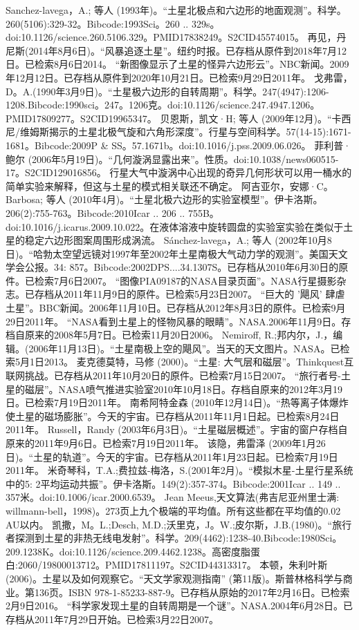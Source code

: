\begin{enumerate}
 Sanchez-lavega，A.; 等人 (1993年)。“土星北极点和六边形的地面观测”。科学。260(5106):329-32。Bibcode:1993Sci。260 .. 329s。doi:10.1126/science.260.5106.329。PMID17838249。S2CID45574015。  
 再见，丹尼斯(2014年8月6日)。“风暴追逐土星”。纽约时报。已存档从原件到2018年7月12日。已检索8月6日2014。
 “新图像显示了土星的怪异六边形云”。NBC新闻。2009年12月12日。已存档从原件到2020年10月21日。已检索9月29日2011年。
 戈弗雷，D。A.(1990年3月9日)。“土星极六边形的自转周期”。科学。247(4947):1206-1208.Bibcode:1990sci。247。1206克。doi:10.1126/science.247.4947.1206。PMID17809277。S2CID19965347。  
 贝恩斯，凯文·H; 等人 (2009年12月)。“卡西尼/维姆斯揭示的土星北极气旋和六角形深度”。行星与空间科学。57(14-15):1671-1681。Bibcode:2009P & SS。57.1671b。doi:10.1016/j.pss.2009.06.026。
 菲利普·鲍尔 (2006年5月19日)。“几何漩涡显露出来”。性质。doi:10.1038/news060515-17。S2CID129016856。 行星大气中漩涡中心出现的奇异几何形状可以用一桶水的简单实验来解释，但这与土星的模式相关联还不确定。
 阿吉亚尔，安娜·C。Barbosa; 等人 (2010年4月)。“土星北极六边形的实验室模型”。伊卡洛斯。206(2):755-763。Bibcode:2010Icar .. 206 .. 755B。doi:10.1016/j.icarus.2009.10.022。在液体溶液中旋转圆盘的实验室实验在类似于土星的稳定六边形图案周围形成涡流。
 Sánchez-lavega，A.; 等人 (2002年10月8日)。“哈勃太空望远镜对1997年至2002年土星南极大气动力学的观测”。美国天文学会公报。34: 857。Bibcode:2002DPS....34.1307S。已存档从2010年6月30日的原件。已检索7月6日2007。
 “图像PIA09187的NASA目录页面”。NASA行星摄影杂志。已存档从2011年11月9日的原件。已检索5月23日2007。
 “巨大的 '飓风' 肆虐土星”。BBC新闻。2006年11月10日。已存档从2012年8月3日的原件。已检索9月29日2011年。
 “NASA看到土星上的怪物风暴的眼睛”。NASA.2006年11月9日。存档自原来的2008年5月7日。已检索11月20日2006。
 Nemiroff, R.;邦内尔，J.，编辑。(2006年11月13日)。“土星南极上空的飓风”。当天的天文图片。NASA。已检索5月1日2013。
 麦克德莫特，马修 (2000)。“土星: 大气层和磁层”。Thinkquest互联网挑战。已存档从2011年10月20日的原件。已检索7月15日2007。
 “旅行者号-土星的磁层”。NASA喷气推进实验室2010年10月18日。存档自原来的2012年3月19日。已检索7月19日2011年。
 南希阿特金森 (2010年12月14日)。“热等离子体爆炸使土星的磁场膨胀”。今天的宇宙。已存档从2011年11月1日起。已检索8月24日2011年。
 Russell，Randy (2003年6月3日)。“土星磁层概述”。宇宙的窗户存档自原来的2011年9月6日。已检索7月19日2011年。
 该隐，弗雷泽 (2009年1月26日)。“土星的轨道”。今天的宇宙。已存档从2011年1月23日起。已检索7月19日2011年。
 米奇琴科，T.A.;费拉兹-梅洛，S.(2001年2月)。“模拟木星-土星行星系统中的5: 2平均运动共振”。伊卡洛斯。149(2):357-374。Bibcode:2001Icar .. 149 .. 357米。doi:10.1006/icar.2000.6539。
 Jean Meeus,天文算法(弗吉尼亚州里士满: willmann-bell，1998)。273页上九个极端的平均值。所有这些都在平均值的0.02 AU以内。
 凯撒，M。L.;Desch, M.D.;沃里克，J。W.;皮尔斯，J.B.(1980)。“旅行者探测到土星的非热无线电发射”。科学。209(4462):1238-40.Bibcode:1980Sci。209.1238K。doi:10.1126/science.209.4462.1238。高密度脂蛋白:2060/19800013712。PMID17811197。S2CID44313317。  
 本顿，朱利叶斯 (2006)。土星以及如何观察它。“天文学家观测指南” (第11版)。斯普林格科学与商业。第136页。ISBN 978-1-85233-887-9。已存档从原始的2017年2月16日。已检索2月9日2016。
 “科学家发现土星的自转周期是一个谜”。NASA.2004年6月28日。已存档从2011年7月29日开始。已检索3月22日2007。

 \end{enumerate}










